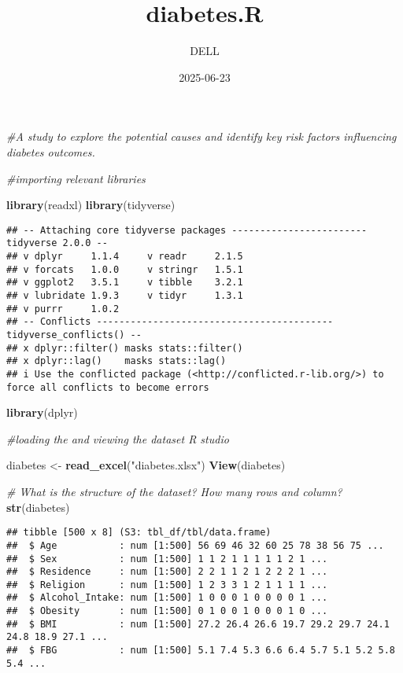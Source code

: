 \documentclass[
]{article}
\title{diabetes.R}
\author{DELL}
\date{2025-06-23}
\newenvironment{Shaded}{\begin{snugshade}}{\end{snugshade}}
\newcommand{\CommentTok}[1]{\textcolor[rgb]{0.56,0.35,0.01}{\textit{#1}}}
\newcommand{\FunctionTok}[1]{\textcolor[rgb]{0.13,0.29,0.53}{\textbf{#1}}}
\newcommand{\NormalTok}[1]{#1}
\newcommand{\OtherTok}[1]{\textcolor[rgb]{0.56,0.35,0.01}{#1}}
\newcommand{\StringTok}[1]{\textcolor[rgb]{0.31,0.60,0.02}{#1}}
\begin{document}
\maketitle

\begin{Shaded}
\begin{Highlighting}[]
\CommentTok{\#A study to explore the potential causes and identify key risk factors influencing diabetes outcomes.}

\CommentTok{\#importing relevant libraries}

\FunctionTok{library}\NormalTok{(readxl)}
\FunctionTok{library}\NormalTok{(tidyverse)}
\end{Highlighting}
\end{Shaded}

\begin{verbatim}
## -- Attaching core tidyverse packages ------------------------ tidyverse 2.0.0 --
## v dplyr     1.1.4     v readr     2.1.5
## v forcats   1.0.0     v stringr   1.5.1
## v ggplot2   3.5.1     v tibble    3.2.1
## v lubridate 1.9.3     v tidyr     1.3.1
## v purrr     1.0.2     
## -- Conflicts ------------------------------------------ tidyverse_conflicts() --
## x dplyr::filter() masks stats::filter()
## x dplyr::lag()    masks stats::lag()
## i Use the conflicted package (<http://conflicted.r-lib.org/>) to force all conflicts to become errors
\end{verbatim}

\begin{Shaded}
\begin{Highlighting}[]
\FunctionTok{library}\NormalTok{(dplyr)}

\CommentTok{\#loading the and viewing the dataset R studio}

\NormalTok{diabetes }\OtherTok{\textless{}{-}} \FunctionTok{read\_excel}\NormalTok{(}\StringTok{"diabetes.xlsx"}\NormalTok{)}
\FunctionTok{View}\NormalTok{(diabetes)}

\CommentTok{\# What is the structure of the dataset? How many rows and column?}
\FunctionTok{str}\NormalTok{(diabetes)}
\end{Highlighting}
\end{Shaded}

\begin{verbatim}
## tibble [500 x 8] (S3: tbl_df/tbl/data.frame)
##  $ Age           : num [1:500] 56 69 46 32 60 25 78 38 56 75 ...
##  $ Sex           : num [1:500] 1 1 2 1 1 1 1 1 2 1 ...
##  $ Residence     : num [1:500] 2 2 1 1 2 1 2 2 2 1 ...
##  $ Religion      : num [1:500] 1 2 3 3 1 2 1 1 1 1 ...
##  $ Alcohol_Intake: num [1:500] 1 0 0 0 1 0 0 0 0 1 ...
##  $ Obesity       : num [1:500] 0 1 0 0 1 0 0 0 1 0 ...
##  $ BMI           : num [1:500] 27.2 26.4 26.6 19.7 29.2 29.7 24.1 24.8 18.9 27.1 ...
##  $ FBG           : num [1:500] 5.1 7.4 5.3 6.6 6.4 5.7 5.1 5.2 5.8 5.4 ...
\end{verbatim}
\end{document}
